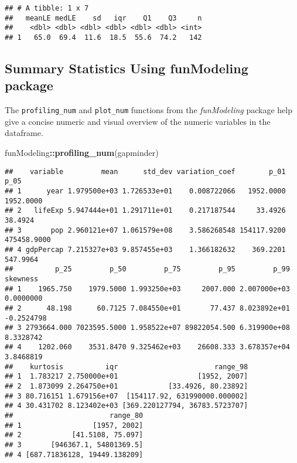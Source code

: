 \documentclass[
]{book}
\newenvironment{Shaded}{\begin{snugshade}}{\end{snugshade}}
\newcommand{\KeywordTok}[1]{\textcolor[rgb]{0.13,0.29,0.53}{\textbf{#1}}}
\newcommand{\NormalTok}[1]{#1}
\newcommand{\OperatorTok}[1]{\textcolor[rgb]{0.81,0.36,0.00}{\textbf{#1}}}
\begin{document}
\begin{verbatim}
## # A tibble: 1 x 7
##   meanLE medLE    sd   iqr    Q1    Q3     n
##    <dbl> <dbl> <dbl> <dbl> <dbl> <dbl> <int>
## 1   65.0  69.4  11.6  18.5  55.6  74.2   142
\end{verbatim}

\hypertarget{summary-statistics-using-funmodeling-package}{%
\subsection{Summary Statistics Using funModeling package}\label{summary-statistics-using-funmodeling-package}}

The \texttt{profiling\_num} and \texttt{plot\_num} functions from the \emph{funModeling} package help
give a concise numeric and visual overview of the numeric variables in the
dataframe.

\begin{Shaded}
\begin{Highlighting}[]
\NormalTok{funModeling}\OperatorTok{::}\KeywordTok{profiling_num}\NormalTok{(gapminder)}
\end{Highlighting}
\end{Shaded}

\begin{verbatim}
##    variable         mean      std_dev variation_coef        p_01        p_05
## 1      year 1.979500e+03 1.726533e+01    0.008722066   1952.0000   1952.0000
## 2   lifeExp 5.947444e+01 1.291711e+01    0.217187544     33.4926     38.4924
## 3       pop 2.960121e+07 1.061579e+08    3.586268548 154117.9200 475458.9000
## 4 gdpPercap 7.215327e+03 9.857455e+03    1.366182632    369.2201    547.9964
##          p_25         p_50         p_75         p_95         p_99   skewness
## 1    1965.750    1979.5000 1.993250e+03     2007.000 2.007000e+03  0.0000000
## 2      48.198      60.7125 7.084550e+01       77.437 8.023892e+01 -0.2524798
## 3 2793664.000 7023595.5000 1.958522e+07 89822054.500 6.319900e+08  8.3328742
## 4    1202.060    3531.8470 9.325462e+03    26608.333 3.678357e+04  3.8468819
##    kurtosis          iqr                       range_98
## 1  1.783217 2.750000e+01                   [1952, 2007]
## 2  1.873099 2.264750e+01            [33.4926, 80.23892]
## 3 80.716151 1.679156e+07  [154117.92, 631990000.000002]
## 4 30.431702 8.123402e+03 [369.220127794, 36783.5723707]
##                       range_80
## 1                 [1957, 2002]
## 2            [41.5108, 75.097]
## 3       [946367.1, 54801369.5]
## 4 [687.71836128, 19449.138209]
\end{verbatim}
\end{document}
